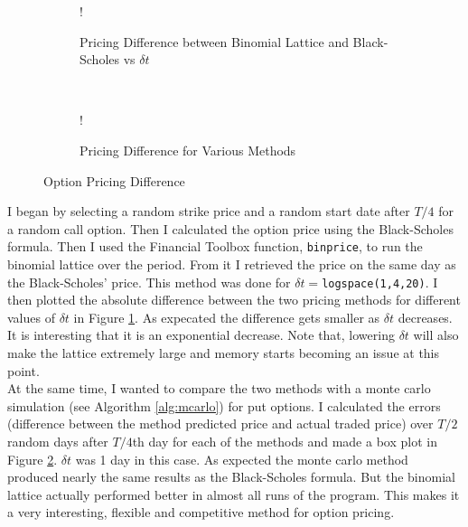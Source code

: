 \documentclass[11pt, fleqn]{article}
\begin{document}
\begin{figure}[!h]
   \centering 
   \begin{subfigure}[b]{0.45\textwidth}
     	\resizebox {\textwidth} {!} { }
		\caption{Pricing Difference between Binomial Lattice and Black-Scholes vs $\delta t$}
		\label{fig:q4-bls-vs-binomial}
    \end{subfigure}
    ~
    \begin{subfigure}[b]{0.44\textwidth}
       	\resizebox {\textwidth} {!} { }
		\caption{Pricing Difference for Various Methods}
        \label{fig:q4-bls-vs-binomial-vs-monte-error}
    \end{subfigure}
    \caption{Option Pricing Difference}
	\label{fig:pricing-difference}
\end{figure}

I began by selecting a random strike price and a random start date after $T/4$ for a random call option. Then I calculated the option price using the Black-Scholes formula. Then I used the Financial Toolbox function, \texttt{binprice}, to run the binomial lattice over the period. From it I retrieved the price on the same day as the Black-Scholes' price. This method was done for $\delta t = $\texttt{logspace(1,4,20)}. I then plotted the absolute difference between the two pricing methods for different values of $\delta t$ in Figure \ref{fig:q4-bls-vs-binomial}. As expecated the difference gets smaller as $\delta t$ decreases. It is interesting that it is an exponential decrease. Note that, lowering $\delta t$ will also make the lattice extremely large and memory starts becoming an issue at this point.\\

At the same time, I wanted to compare the two methods with a monte carlo simulation (see Algorithm \ref{alg:mcarlo}) for put options. I calculated the errors (difference between the method predicted price and actual traded price) over $T/2$ random days after $T/4$th day for each of the methods and made a box plot in Figure \ref{fig:q4-bls-vs-binomial-vs-monte-error}. $\delta t$ was 1 day in this case. As expected the monte carlo method produced nearly the same results as the Black-Scholes formula. But the binomial lattice actually performed better in almost all runs of the program. This makes it a very interesting, flexible and competitive method for option pricing.
\end{document}
